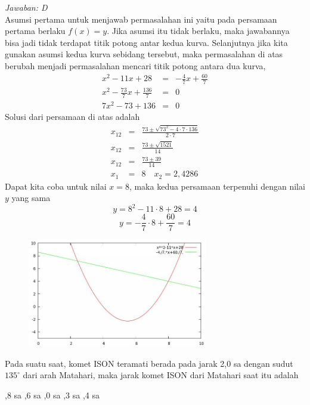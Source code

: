 \documentclass[11pt,fleqn, a4paper]{exam}
\begin{document}
\begin{questions}
\textit{Jawaban: D}\\
Asumsi pertama untuk menjawab permasalahan ini yaitu pada persamaan pertama berlaku $f(x) = y$. Jika asumsi itu tidak berlaku, maka jawabannya bisa jadi tidak terdapat titik potong antar kedua kurva. Selanjutnya jika kita gunakan asumsi kedua kurva sebidang tersebut, maka permasalahan di atas berubah menjadi permasalahan mencari titik potong antara dua kurva, 
\begin{eqnarray*}
x^2 - 11x + 28 &=& -\frac{4}{7} x + \frac{60}{7}\\
x^2 - \frac{73}{7}x + \frac{136}{7} &=& 0\\
7x^2 - 73 + 136 &=& 0
\end{eqnarray*}
Solusi dari persamaan di atas adalah
\begin{eqnarray*}
x_{12} &=& \frac{73 \pm \sqrt{73^2 - 4 \cdot 7 \cdot 136}}{2 \cdot 7}\\
x_{12} &=& \frac{73 \pm \sqrt{1521}}{14}\\
x_{12} &=& \frac{73 \pm 39}{14}\\
x_{1} &=& 8 \quad x_{2} = 2,4286
\end{eqnarray*}
Dapat kita coba untuk nilai $x = 8$, maka kedua persamaan terpenuhi dengan nilai $y$ yang sama 
$$y = 8^2 - 11 \cdot 8 + 28 = 4$$
$$y = -\frac{4}{7} \cdot 8 + \frac{60}{7} = 4$$
\begin{figure}[H]
\centering
\includegraphics[width=0.7\textwidth]{gambar/osk2016_10.jpg}
\end{figure}

\vspace{0.5cm}
\question Pada suatu saat, komet ISON teramati berada pada jarak 2,0 sa dengan sudut $135^{\circ}$ dari arah Matahari, maka jarak komet ISON dari Matahari saat itu adalah
\begin{choices}
,8 sa
,6 sa
,0 sa
,3 sa
,4 sa
\end{choices}


\end{questions}
\end{document}
